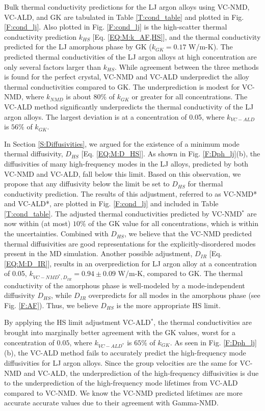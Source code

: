 \documentclass[aps,prb,onecolumn,preprint,footinbib,superscriptaddress,amsmath,amssymb,floatfix]{revtex4}
\begin{document}
Bulk thermal conductivity predictions for the LJ argon alloys using  
VC-NMD, VC-ALD, and GK are tabulated in Table \ref{T:cond_table} 
and plotted in Fig. \ref{F:cond_lj}. Also plotted 
in Fig. \ref{F:cond_lj} is the high-scatter 
thermal conductivity prediction $k_{HS}$ 
[Eq. \eqref{EQ:M:k_AF,HS}], and the thermal conductivity predicted 
for the LJ amorphous phase by GK ($k_{GK} = 0.17$ W/m-K).\cite{vc_fn6_2013} 
The predicted thermal conductivities of the LJ argon alloys at high 
concentration are only several factors larger than $k_{HS}$.  
While agreement between the three methods is found for the perfect 
crystal, VC-NMD and VC-ALD underpredict the alloy thermal 
conductivities compared to GK. 
The underprediction is modest for VC-NMD, where $k_{NMD}$ is about 
$80\%$ of $k_{GK}$ or greater for all concentrations. The VC-ALD method 
significantly underpredicts the thermal conductivity of the LJ argon alloys. 
The largest deviation is at a concentration of 0.05, where 
$k_{VC-ALD}$ is $56\%$ of $k_{GK}$.

In Section \ref{S:Diffusivities}, 
we argued for the existence of a minimum mode thermal 
diffusivity, $D_{HS}$ [Eq. \eqref{EQ:M:D_HS}]. 
As shown in Fig. \ref{F:Dph_lj}(b), the diffusivities of 
many high-frequency modes in the LJ alloys, predicted by both VC-NMD 
and VC-ALD, fall below this limit.  Based on this observation, we propose 
that any diffusivity below the limit be set to $D_{HS}$ 
for thermal conductivity prediction. 
The results of this adjustment, 
referred to as VC-NMD* and VC-ALD*, are plotted in Fig. \ref{F:cond_lj} 
and included in Table \ref{T:cond_table}.  
The adjusted thermal conductivities predicted by VC-NMD$^*$ are now  
within (at most) $10\%$ of the GK value for all concentrations, which
is within the uncertainties. 
Combined with $D_{HS}$, we believe that the VC-NMD predicted thermal 
diffusivities are good representations for the explicitly-disordered 
modes present in the MD simulation. Another possible 
adjustment, $D_{IR}$ [Eq. \eqref{EQ:M:D_IR}], results in an overprediction 
for LJ argon alloy at a concentration of 0.05, 
$k_{VC-NMD^*,D_{IR}} = 0.94 \pm 0.09$ W/m-K, compared to GK. The thermal 
conductivity of the amorphous phase is well-modeled by a mode-independent 
diffusivity $D_{HS}$, while $D_{IR}$ overpredicts for all modes in the 
amorphous phase (see Fig. \ref{F:AF}). 
Thus, we believe $D_{HS}$ is the more appropriate HS limit. 

By applying the HS limit adjustment VC-ALD$^*$, the thermal 
conductivities are brought into marginally better agreement with 
the GK values, worst for a concentration of $0.05$, where 
$k_{VC-ALD^*}$ is $65\%$ of $ k_{GK}$.  
As seen in Fig. \ref{F:Dph_lj}(b), the VC-ALD method fails to 
accurately predict the high-frequency mode diffusivities for 
LJ argon alloys. Since the group velocities are the same for 
VC-NMD and VC-ALD, the underprediction of the high-frequency 
diffusivities is
due to the underprediction of the high-frequency 
mode lifetimes from VC-ALD compared to VC-NMD. We know the VC-NMD 
predicted lifetimes are more accurate accurate values due to their 
agreement with Gamma-NMD. 
\end{document}
